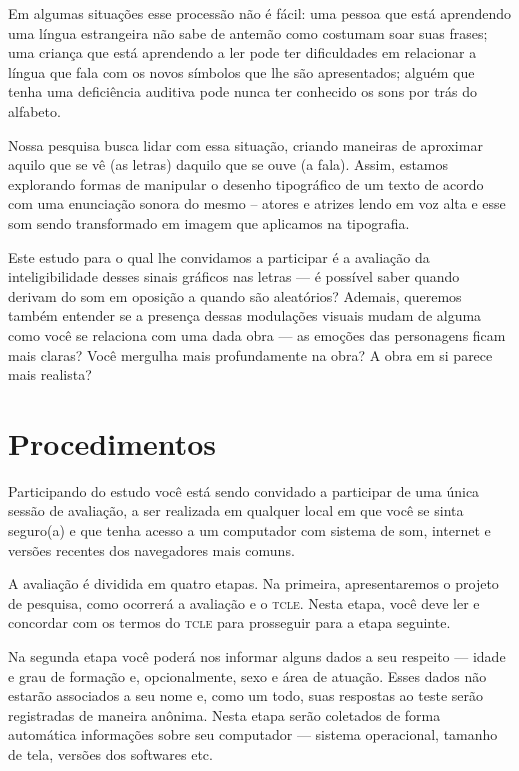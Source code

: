 \documentclass[a4paper,11pt,titlepage,singlespacing]{article}
\begin{document}
Em algumas situações esse processão não é fácil: uma pessoa que está aprendendo uma língua estrangeira não sabe de antemão como costumam soar suas frases; uma criança que está aprendendo a ler pode ter dificuldades em relacionar a língua que fala com os novos símbolos que lhe são apresentados; alguém que tenha uma deficiência auditiva pode nunca ter conhecido os sons por trás do alfabeto.

Nossa pesquisa busca lidar com essa situação, criando maneiras de aproximar aquilo que se vê (as letras) daquilo que se ouve (a fala). Assim, estamos explorando formas de manipular o desenho tipográfico de um texto de acordo com uma enunciação sonora do mesmo – atores e atrizes lendo em voz alta e esse som sendo transformado em imagem que aplicamos na tipografia.

Este estudo para o qual lhe convidamos a participar é a avaliação da inteligibilidade desses sinais gráficos nas letras — é possível saber quando derivam do som em oposição a quando são aleatórios? Ademais, queremos também entender se a presença dessas modulações visuais mudam de alguma como você se relaciona com uma dada obra — as emoções das personagens ficam mais claras? Você mergulha mais profundamente na obra? A obra em si parece mais realista?

\section*{Procedimentos}

\noindent Participando do estudo você está sendo convidado a participar de uma única sessão de avaliação, a ser realizada em qualquer local em que você se sinta seguro(a) e que tenha acesso a um computador com sistema de som, internet e versões recentes dos navegadores mais comuns.

A avaliação é dividida em quatro etapas. Na primeira, apresentaremos o projeto de pesquisa, como ocorrerá a avaliação e o \textsc{tcle}. Nesta etapa, você deve ler e concordar com os termos do \textsc{tcle} para prosseguir para a etapa seguinte.

Na segunda etapa você poderá nos informar alguns dados a seu respeito — idade e grau de formação e, opcionalmente, sexo e área de atuação. Esses dados não estarão associados a seu nome e, como um todo, suas respostas ao teste serão registradas de maneira anônima. Nesta etapa serão coletados de forma automática informações sobre seu computador — sistema operacional, tamanho de tela, versões dos softwares etc.
\end{document}
